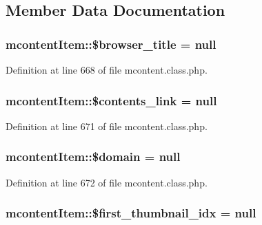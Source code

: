 \subsection{Member Data Documentation}
\hypertarget{classmcontentItem_afdef241bedb2d1829475b7bb623cecf7}{
\subsubsection[{\$browser\-\_\-title}]{\setlength{\rightskip}{0pt plus 5cm}mcontent\-Item\-::\$browser\-\_\-title = null}}\label{classmcontentItem_afdef241bedb2d1829475b7bb623cecf7}


Definition at line 668 of file mcontent.\-class.\-php.

\hypertarget{classmcontentItem_afdee32faf59897fa7e02f9ed4389b411}{
\subsubsection[{\$contents\-\_\-link}]{\setlength{\rightskip}{0pt plus 5cm}mcontent\-Item\-::\$contents\-\_\-link = null}}\label{classmcontentItem_afdee32faf59897fa7e02f9ed4389b411}


Definition at line 671 of file mcontent.\-class.\-php.

\hypertarget{classmcontentItem_ad92b662d98d23cb2a10747de7ffdada0}{
\subsubsection[{\$domain}]{\setlength{\rightskip}{0pt plus 5cm}mcontent\-Item\-::\$domain = null}}\label{classmcontentItem_ad92b662d98d23cb2a10747de7ffdada0}


Definition at line 672 of file mcontent.\-class.\-php.

\hypertarget{classmcontentItem_a358e826e3ee863300d43b12a8218a5fa}{
\subsubsection[{\$first\-\_\-thumbnail\-\_\-idx}]{\setlength{\rightskip}{0pt plus 5cm}mcontent\-Item\-::\$first\-\_\-thumbnail\-\_\-idx = null}}\label{classmcontentItem_a358e826e3ee863300d43b12a8218a5fa}



